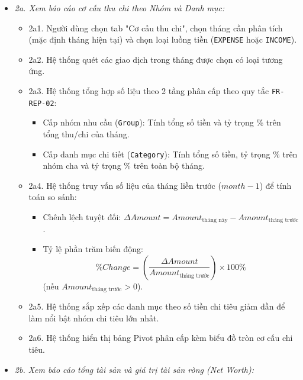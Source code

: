 \documentclass[11pt,a4paper]{article}
\providecommand{\tightlist}{
  \setlength{\itemsep}{0pt}\setlength{\parskip}{0pt}}
\begin{document}
\begin{itemize}
  \begin{itemize}
  \tightlist
  \item
    \emph{2a. Xem báo cáo cơ cấu thu chi theo Nhóm và Danh mục:}

    \begin{itemize}
    \tightlist
    \item
      2a1. Người dùng chọn tab "Cơ cấu thu chi", chọn tháng cần phân
      tích (mặc định tháng hiện tại) và chọn loại luồng tiền
      (\texttt{EXPENSE} hoặc \texttt{INCOME}).
    \item
      2a2. Hệ thống quét các giao dịch trong tháng được chọn có loại
      tương ứng.
    \item
      2a3. Hệ thống tổng hợp số liệu theo 2 tầng phân cấp theo quy tắc
      \texttt{FR-REP-02}:

      \begin{itemize}
      \tightlist
      \item
        Cấp nhóm nhu cầu (\texttt{Group}): Tính tổng số tiền và tỷ trọng
        \% trên tổng thu/chi của tháng.
      \item
        Cấp danh mục chi tiết (\texttt{Category}): Tính tổng số tiền, tỷ
        trọng \% trên nhóm cha và tỷ trọng \% trên toàn bộ tháng.
      \end{itemize}
    \item
      2a4. Hệ thống truy vấn số liệu của tháng liền trước
      (\(month - 1\)) để tính toán so sánh:

      \begin{itemize}
      \tightlist
      \item
        Chênh lệch tuyệt đối:
        \(\Delta Amount = Amount_{\text{tháng này}} - Amount_{\text{tháng trước}}\).
      \item
        Tỷ lệ phần trăm biến động:
        \[
        \% Change = \left(\frac{\Delta Amount}{Amount_{\text{tháng trước}}}\right) \times 100\%
        \]
        (nếu \(Amount_{\text{tháng trước}} > 0\)).
      \end{itemize}
    \item
      2a5. Hệ thống sắp xếp các danh mục theo số tiền chi tiêu giảm dần
      để làm nổi bật nhóm chi tiêu lớn nhất.
    \item
      2a6. Hệ thống hiển thị bảng Pivot phân cấp kèm biểu đồ tròn cơ cấu
      chi tiêu.
    \end{itemize}
  \item
    \emph{2b. Xem báo cáo tổng tài sản và giá trị tài sản ròng (Net
    Worth):}


\end{itemize}
\end{itemize}
\end{document}
